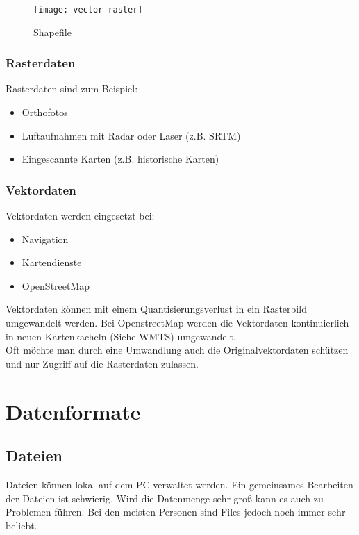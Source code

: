 \documentclass[11pt,fleqn]{book} %
\begin{document}
\begin{figure}[h]
\centering\texttt{[image: vector-raster]}
\caption{Shapefile}
\end{figure}

\subsection{Rasterdaten}

Rasterdaten sind zum Beispiel:
\begin{itemize}
\item Orthofotos
\item Luftaufnahmen mit Radar oder Laser (z.B. SRTM)
\item Eingescannte Karten (z.B. historische Karten)
\end{itemize}

\subsection{Vektordaten}

Vektordaten werden eingesetzt bei:
\begin{itemize}
\item Navigation
\item Kartendienste
\item OpenStreetMap
\end{itemize}

Vektordaten können mit einem Quantisierungsverlust in ein Rasterbild umgewandelt werden. Bei OpenstreetMap werden die Vektordaten kontinuierlich in neuen Kartenkacheln (Siehe WMTS)
umgewandelt. \\
Oft m\"ochte man durch eine Umwandlung auch die Originalvektordaten sch\"utzen und nur Zugriff auf die Rasterdaten zulassen.   



\chapter{Datenformate}
\section{Dateien}
Dateien k\"onnen lokal auf dem PC verwaltet werden. Ein gemeinsames Bearbeiten der Dateien ist schwierig. Wird die Datenmenge sehr gro{\ss} kann es auch zu Problemen f\"uhren. Bei den meisten Personen sind Files jedoch noch immer sehr beliebt.
\end{document}
